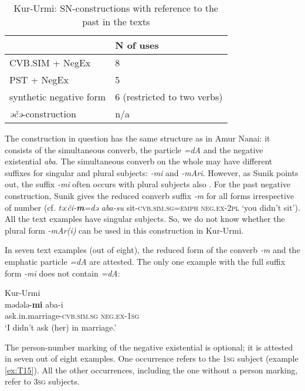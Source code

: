 \documentclass[output=paper]{langscibook}
\begin{document}
\begin{table}[!h]
    \caption{Kur-Urmi: SN-constructions with reference to the past in the texts \citep{sunik1958a}}
    \label{tab:T4}
    \begin{tabular}{@{}ll@{}}
    \toprule
     & N of uses \\ \midrule
    CVB.SIM + NegEx & 8 \\
    PST + NegEx & 5 \\
    synthetic negative form & 6 (restricted to two verbs) \\
    \textit{əčə}-construction & n/a \\ \bottomrule
    \end{tabular}
    \end{table}

The construction in question has the same structure as in Amur Nanai: it consists of the simultaneous converb, the particle \textit{=dA} and the negative existential \textit{aba}. The simultaneous converb on the whole may have different suffixes for singular and plural subjects: \textit{-mi} and \textit{-mAri}. However, as Sunik points out, the suffix \textit{-mi} often occurs with plural subjects also \citep[95]{sunik1958a}. For the past negative construction, Sunik gives the reduced converb suffix \textit{-m} for all forms irrespective of number (cf. \textit{təːči-\textbf{m}=də aba-su} sit-\textsc{cvb.sim.sg=emph} \textsc{neg.ex-2pl} `you didn’t sit'). All the text examples have singular subjects. So, we do not know whether the plural form \textit{-mAr(i)} can be used in this construction in Kur-Urmi.

In seven text examples (out of eight), the reduced form of the converb \textit{‑m} and the emphatic particle \textit{=dA} are attested. The only one example with the full suffix form \textit{-mi} does not contain \textit{=dA}:

\ea Kur-Urmi \label{ex:T15}\\
	\gll mədələ-\textbf{mi}	aba-i\\
	ask.in.marriage-\textsc{cvb.sim.sg}	\textsc{neg.ex-1sg}\\
	\glt `I didn’t ask (her) in marriage.' \citep[127, text]{sunik1958a}
\z

The person-number marking of the negative existential is optional; it is attested in seven out of eight examples. One occurrence refers to the \textsc{1sg} subject (example \ref{ex:T15}). All the other occurrences, including the one without a person marking, refer to \textsc{3sg} subjects.
\end{document}

